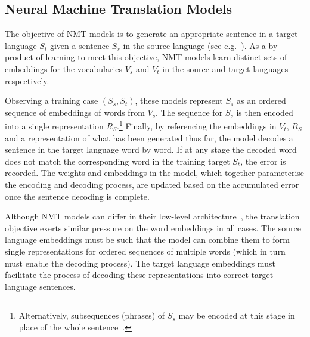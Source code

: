 \subsection{Neural Machine Translation Models}

The objective of NMT models is to generate an appropriate sentence in a target language \(S_t\)  given a sentence \(S_s\) in the source language (see e.g.~\citep{kalchbrenner13emnlp,Sutskever2014sequence}). As a by-product of learning to meet this objective, NMT models learn distinct sets of embeddings for the vocabularies \(V_ s\) and \(V_t\) in the source and target languages respectively.

Observing a training case \((S_s, S_t)\), these models represent \(S_s\) as an ordered sequence of embeddings of words from \(V_s\). The sequence for \(S_s\) is then encoded into a single representation \(R_S\).\footnote{Alternatively, subsequences (phrases) of \(S_s\) may be encoded at this stage in place of the whole sentence~\citep{bahdanau2014neural}.} Finally, by referencing the embeddings in \(V_t\), \(R_S\) and a representation of what has been generated thus far, the model decodes a sentence in the target language word by word. If at any stage the decoded word does not match the corresponding word in the training target \(S_t\), the error is recorded. The weights and embeddings in the model, which together parameterise the encoding and decoding process, are updated based on the accumulated error once the sentence decoding is complete. 

Although NMT models can differ in their low-level architecture~\citep{kalchbrenner13emnlp,Cho2014,bahdanau2014neural}, the translation objective exerts similar pressure on the word embeddings in all cases. The source language embeddings must be such that the model can combine them to form single representations for ordered sequences of multiple words (which in turn must enable the decoding process). The target language embeddings must facilitate the process of decoding these representations into correct target-language sentences.    

